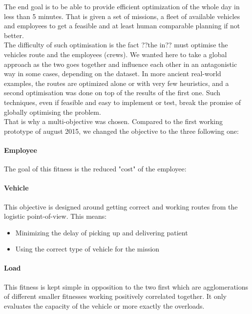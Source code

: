 \documentclass[12pt]{memoir}
\begin{document}
\bigskip
The end goal is to be able to provide efficient optimization of the whole day in
less than 5 minutes. That is given a set of missions, a fleet of available vehicles
and employees to get a feasible and at least human comparable planning if not
better. \\
The difficulty of such optimisation is the fact ??the in?? must optimise the vehicles
route and the employees (crews). We wanted here to take a global approach as the two
goes together and influence each other in an antagonistic way in some cases, depending
on the dataset. In more ancient real-world examples, the routes are optimized alone
or with very few heuristics, and a second optimisation was done on top of the results
of the first one. Such techniques, even if feasible and easy to implement or test,
break the promise of globally optimising the problem.\\
That is why a multi-objective was chosen. Compared to the first working prototype
of august 2015, we changed the objective to the three following one:

\paragraph{Employee} %
\label{par:Employee}
The goal of this fitness is the reduced "cost" of the employee:


\paragraph{Vehicle} %
\label{par:Vehicle}
This objective is designed around getting correct and working routes from the
logistic point-of-view. This means:
\begin{itemize}
  \item Minimizing the delay of picking up and delivering patient
  \item Using the correct type of vehicle for the mission
\end{itemize}

\paragraph{Load} %
This fitness is kept simple in opposition to the two first which are agglomerations
of different smaller fitnesses working positively correlated together. It only
evaluates the capacity of the vehicle or more exactly the overloads.
\label{par:Load}
\end{document}
